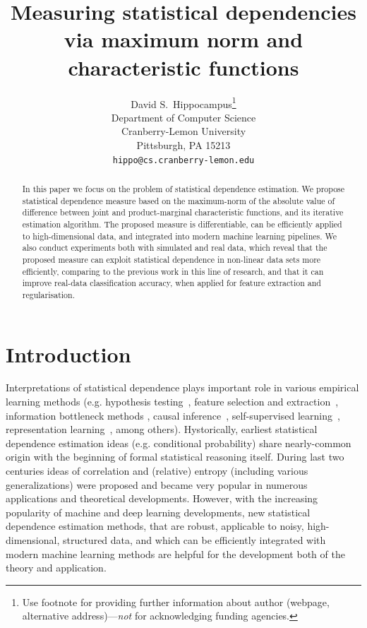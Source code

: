 \documentclass{article}
\title{Measuring statistical dependencies via maximum norm and characteristic functions}
\author{%
  David S.~Hippocampus\thanks{Use footnote for providing further information
    about author (webpage, alternative address)---\emph{not} for acknowledging
    funding agencies.} \\
  Department of Computer Science\\
  Cranberry-Lemon University\\
  Pittsburgh, PA 15213 \\
  \texttt{hippo@cs.cranberry-lemon.edu} \\
}
\begin{document}
\maketitle


\begin{abstract}
    In this paper we focus on the problem of statistical dependence estimation. We propose statistical dependence measure based on the maximum-norm of the absolute value of difference between joint and product-marginal characteristic functions, and its iterative estimation algorithm. The proposed measure is differentiable, can be efficiently applied to high-dimensional data, and integrated into modern machine learning pipelines. We also conduct experiments both with simulated and real data, which reveal that the proposed measure can exploit statistical dependence in non-linear data sets more efficiently, comparing to the previous work in this line of research, and that it can improve real-data classification accuracy, when applied for feature extraction and regularisation.
\end{abstract}

\section{Introduction}
Interpretations of  statistical dependence plays important role in various empirical learning methods (e.g. hypothesis testing~\cite{Gretton2005MeasuringSD}, feature selection and extraction~\cite{EigenHSIC,HSCA}, information bottleneck methods \cite{Ma2020TheHB}, causal inference~\cite{NIPS2008_f7664060}, self-supervised learning~\cite{li2021selfsupervised}, representation learning~\cite{Ragonesi2021LearningUR}, among others).  Hystorically, earliest statistical dependence estimation ideas (e.g. conditional probability) share nearly-common origin with the beginning of formal statistical reasoning itself. During last two centuries ideas of correlation and (relative) entropy (including various generalizations) were proposed and became very popular in numerous applications and theoretical developments. However, with the increasing popularity of machine and deep learning developments, new statistical dependence estimation methods, that are robust, applicable to noisy, high-dimensional, structured data, and which can be efficiently integrated with modern machine learning methods are helpful for the development both of the theory and application.
\end{document}
